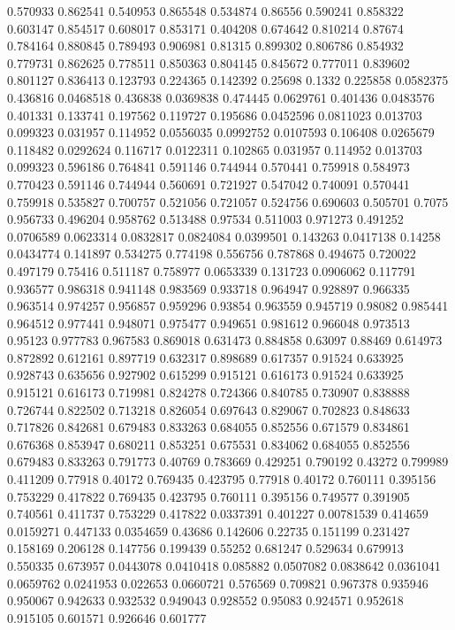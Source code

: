 0.570933 0.862541
0.540953 0.865548
0.534874 0.86556
0.590241 0.858322
0.603147 0.854517
0.608017 0.853171
0.404208 0.674642
0.810214 0.87674
0.784164 0.880845
0.789493 0.906981
0.81315 0.899302
0.806786 0.854932
0.779731 0.862625
0.778511 0.850363
0.804145 0.845672
0.777011 0.839602
0.801127 0.836413
0.123793 0.224365
0.142392 0.25698
0.1332 0.225858
0.0582375 0.436816
0.0468518 0.436838
0.0369838 0.474445
0.0629761 0.401436
0.0483576 0.401331
0.133741 0.197562
0.119727 0.195686
0.0452596 0.0811023
0.013703 0.099323
0.031957 0.114952
0.0556035 0.0992752
0.0107593 0.106408
0.0265679 0.118482
0.0292624 0.116717
0.0122311 0.102865
0.031957 0.114952
0.013703 0.099323
0.596186 0.764841
0.591146 0.744944
0.570441 0.759918
0.584973 0.770423
0.591146 0.744944
0.560691 0.721927
0.547042 0.740091
0.570441 0.759918
0.535827 0.700757
0.521056 0.721057
0.524756 0.690603
0.505701 0.7075
0.956733 0.496204
0.958762 0.513488
0.97534 0.511003
0.971273 0.491252
0.0706589 0.0623314
0.0832817 0.0824084
0.0399501 0.143263
0.0417138 0.14258
0.0434774 0.141897
0.534275 0.774198
0.556756 0.787868
0.494675 0.720022
0.497179 0.75416
0.511187 0.758977
0.0653339 0.131723
0.0906062 0.117791
0.936577 0.986318
0.941148 0.983569
0.933718 0.964947
0.928897 0.966335
0.963514 0.974257
0.956857 0.959296
0.93854 0.963559
0.945719 0.98082
0.985441 0.964512
0.977441 0.948071
0.975477 0.949651
0.981612 0.966048
0.973513 0.95123
0.977783 0.967583
0.869018 0.631473
0.884858 0.63097
0.88469 0.614973
0.872892 0.612161
0.897719 0.632317
0.898689 0.617357
0.91524 0.633925
0.928743 0.635656
0.927902 0.615299
0.915121 0.616173
0.91524 0.633925
0.915121 0.616173
0.719981 0.824278
0.724366 0.840785
0.730907 0.838888
0.726744 0.822502
0.713218 0.826054
0.697643 0.829067
0.702823 0.848633
0.717826 0.842681
0.679483 0.833263
0.684055 0.852556
0.671579 0.834861
0.676368 0.853947
0.680211 0.853251
0.675531 0.834062
0.684055 0.852556
0.679483 0.833263
0.791773 0.40769
0.783669 0.429251
0.790192 0.43272
0.799989 0.411209
0.77918 0.40172
0.769435 0.423795
0.77918 0.40172
0.760111 0.395156
0.753229 0.417822
0.769435 0.423795
0.760111 0.395156
0.749577 0.391905
0.740561 0.411737
0.753229 0.417822
0.0337391 0.401227
0.00781539 0.414659
0.0159271 0.447133
0.0354659 0.43686
0.142606 0.22735
0.151199 0.231427
0.158169 0.206128
0.147756 0.199439
0.55252 0.681247
0.529634 0.679913
0.550335 0.673957
0.0443078 0.0410418
0.085882 0.0507082
0.0838642 0.0361041
0.0659762 0.0241953
0.022653 0.0660721
0.576569 0.709821
0.967378 0.935946
0.950067 0.942633
0.932532 0.949043
0.928552 0.95083
0.924571 0.952618
0.915105 0.601571
0.926646 0.601777
